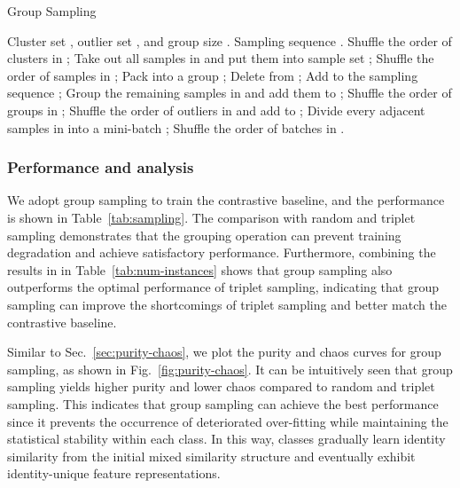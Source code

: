 \documentclass[lettersize,journal]{IEEEtran}
\begin{document}
\begin{algorithm}[th]
\caption{Group Sampling}
\small
\label{alg:gather-sampling}
\begin{algorithmic}[1]
   \REQUIRE Cluster set , outlier set , and group size .
   \ENSURE Sampling sequence .
   \STATE Shuffle the order of clusters in ;
   \STATE Take out all samples in  and put them into sample set ;
   \STATE Shuffle the order of samples in ;
   \WHILE{}
   \STATE Pack  into a group ;
   \STATE Delete  from ;
   \STATE Add  to the sampling sequence ;
   \ENDWHILE
   \STATE Group the remaining samples in  and add them to ;
   \ENDFOR
   \STATE Shuffle the order of groups in ;
   \STATE Shuffle the order of outliers in  and add  to ;
   \STATE Divide every adjacent  samples in  into a mini-batch ;
   \STATE Shuffle the order of batches in .
\end{algorithmic}
\end{algorithm}

\subsubsection{Performance and analysis}
We adopt group sampling to train the contrastive baseline, and the performance is shown in Table~\ref{tab:sampling}. The comparison with random and triplet sampling demonstrates that the grouping operation can prevent training degradation and achieve satisfactory performance.
Furthermore, combining the results in in Table~\ref{tab:num-instances} shows that group sampling also outperforms the optimal performance of triplet sampling, indicating that group sampling can improve the shortcomings of triplet sampling and better match the contrastive baseline.

Similar to Sec.~\ref{sec:purity-chaos}, we plot the purity and chaos curves for group sampling, as shown in Fig.~\ref{fig:purity-chaos}. 
It can be intuitively seen that group sampling yields higher purity and lower chaos compared to random and triplet sampling. 
This indicates that group sampling can achieve the best performance since it prevents the occurrence of deteriorated over-fitting while maintaining the statistical stability within each class. 
In this way, classes gradually learn identity similarity from the initial mixed similarity structure and eventually exhibit identity-unique feature representations.
\end{document}
